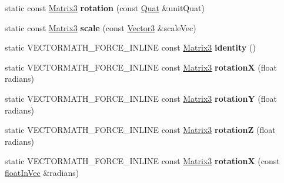 \begin{DoxyCompactItemize}
static const \hyperlink{classVectormath_1_1Aos_1_1Matrix3}{Matrix3} {\bfseries rotation} (const \hyperlink{classVectormath_1_1Aos_1_1Quat}{Quat} \&unit\+Quat)
\item 
\mbox{\label{classVectormath_1_1Aos_1_1Matrix3_a8007cbbfe3a8aab7863d1c1c0c329c0f}} 
static const \hyperlink{classVectormath_1_1Aos_1_1Matrix3}{Matrix3} {\bfseries scale} (const \hyperlink{classVectormath_1_1Aos_1_1Vector3}{Vector3} \&scale\+Vec)
\item 
\mbox{\label{classVectormath_1_1Aos_1_1Matrix3_a5a53aa0cafda17380201bef508bf0273}} 
static V\+E\+C\+T\+O\+R\+M\+A\+T\+H\+\_\+\+F\+O\+R\+C\+E\+\_\+\+I\+N\+L\+I\+NE const \hyperlink{classVectormath_1_1Aos_1_1Matrix3}{Matrix3} {\bfseries identity} ()
\item 
\mbox{\label{classVectormath_1_1Aos_1_1Matrix3_ad817b69c5b99754285510719042cd479}} 
static V\+E\+C\+T\+O\+R\+M\+A\+T\+H\+\_\+\+F\+O\+R\+C\+E\+\_\+\+I\+N\+L\+I\+NE const \hyperlink{classVectormath_1_1Aos_1_1Matrix3}{Matrix3} {\bfseries rotationX} (float radians)
\item 
\mbox{\label{classVectormath_1_1Aos_1_1Matrix3_a7af8c94b47f2b8f6a00b5817bdc2ae4c}} 
static V\+E\+C\+T\+O\+R\+M\+A\+T\+H\+\_\+\+F\+O\+R\+C\+E\+\_\+\+I\+N\+L\+I\+NE const \hyperlink{classVectormath_1_1Aos_1_1Matrix3}{Matrix3} {\bfseries rotationY} (float radians)
\item 
\mbox{\label{classVectormath_1_1Aos_1_1Matrix3_aae878a22974e41c2c2b7fd9e73ec7e02}} 
static V\+E\+C\+T\+O\+R\+M\+A\+T\+H\+\_\+\+F\+O\+R\+C\+E\+\_\+\+I\+N\+L\+I\+NE const \hyperlink{classVectormath_1_1Aos_1_1Matrix3}{Matrix3} {\bfseries rotationZ} (float radians)
\item 
\mbox{\label{classVectormath_1_1Aos_1_1Matrix3_af77e6ab7e4a0004b178288666dcd1841}} 
static V\+E\+C\+T\+O\+R\+M\+A\+T\+H\+\_\+\+F\+O\+R\+C\+E\+\_\+\+I\+N\+L\+I\+NE const \hyperlink{classVectormath_1_1Aos_1_1Matrix3}{Matrix3} {\bfseries rotationX} (const \hyperlink{classVectormath_1_1floatInVec}{float\+In\+Vec} \&radians)
\item 
\mbox{\label{classVectormath_1_1Aos_1_1Matrix3_aac514ca404b7b880db2f79662da4b242}} 

\end{DoxyCompactItemize}

